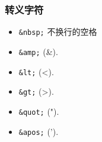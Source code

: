 \subsubsection{转义字符}
\begin{itemize}
\item \verb`&nbsp;` 不换行的空格
\item \verb`&amp;` (&).
\item \verb`&lt;` (<).
\item \verb`&gt;` (>).
\item \verb`&quot;` (").
\item \verb`&apos;` (').
\end{itemize}
